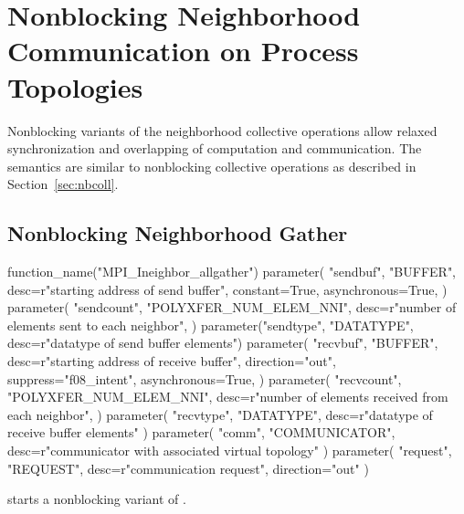 \section[Nonblocking Neighborhood Communication]{Nonblocking Neighborhood Communication on Process Topologies}
\label{sec:sparsecoll-nbc}

Nonblocking variants of the neighborhood collective operations allow
relaxed synchronization and
overlapping of computation and communication.
The semantics are similar to nonblocking collective
operations as described in Section~\ref{sec:nbcoll}. 

\subsection{Nonblocking Neighborhood Gather}

\begin{mpi-binding}
    function_name("MPI_Ineighbor_allgather")
    parameter(
        "sendbuf",
        "BUFFER",
        desc=r"starting address of send buffer",
        constant=True,
        asynchronous=True,
    )
    parameter(
        "sendcount",
        "POLYXFER_NUM_ELEM_NNI",
        desc=r"number of elements sent to each neighbor",
    )
    parameter("sendtype", "DATATYPE", desc=r"datatype of send buffer elements")
    parameter(
        "recvbuf",
        "BUFFER",
        desc=r"starting address of receive buffer",
        direction="out",
        suppress="f08_intent",
        asynchronous=True,
    )
    parameter(
        "recvcount",
        "POLYXFER_NUM_ELEM_NNI",
        desc=r"number of elements received from each neighbor",
    )
    parameter(
        "recvtype", "DATATYPE", desc=r"datatype of receive buffer elements"
    )
    parameter(
        "comm", "COMMUNICATOR", desc=r"communicator with associated virtual topology"
    )
    parameter(
        "request", "REQUEST", desc=r"communication request", direction="out"
    )
\end{mpi-binding}

 starts a nonblocking variant of
.

